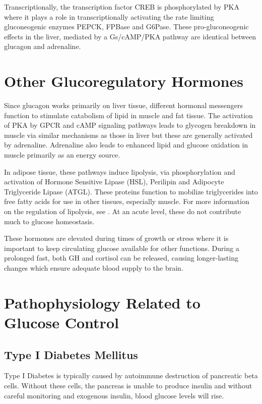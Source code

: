 \documentclass{tufte-handout}
\begin{document}
Transcriptionally, the transcription factor CREB is phosphorylated by PKA where it plays a role in transcriptionally activating the rate limiting gluconeogenic enzymes PEPCK, FPBase and G6Pase.  These pro-gluconeogenic effects in the liver, mediated by a Gs/cAMP/PKA pathway are identical between glucagon and adrenaline.

\section{Other Glucoregulatory Hormones}

Since glucagon works primarily on liver tissue, different hormonal messengers function to stimulate catabolism of lipid in muscle and fat tissue.  The activation of PKA by GPCR and cAMP signaling pathways leads to glycogen breakdown in muscle via similar mechanisms as those in liver but these are generally activated by adrenaline.  Adrenaline also leads to enhanced lipid and glucose oxidation in muscle primarily as an energy source.

In adipose tissue, these pathways induce lipolysis, via phosphorylation and activation of Hormone Sensitive Lipase (HSL), Perilipin and Adipocyte Triglyceride Lipase (ATGL).  These proteins function to mobilize triglycerides into free fatty acids for use in other tissues, especially muscle.  For more information on the regulation of lipolysis, see \cite{Young2013}.  At an acute level, these do not contribute much to glucose homeostasis.

  These hormones are elevated during times of growth or stress where it is important to keep circulating glucose available for other functions.  During a prolonged fast, both GH and cortisol can be released, causing longer-lasting changes which ensure adequate blood supply to the brain.

\section{Pathophysiology Related to Glucose Control}

\subsection{Type I Diabetes Mellitus}

Type I Diabetes is typically caused by autoimmune destruction of pancreatic beta cells.  Without these cells, the pancreas is unable to produce insulin and without careful monitoring and exogenous insulin, blood glucose levels will rise.
\end{document}
